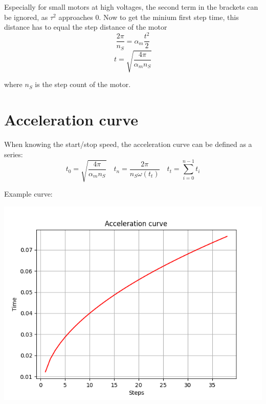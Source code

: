 \documentclass{article}
\begin{document}
    Especially for small motors at high voltages, the second term in the brackets can be ignored, as $\tau^2$ approaches 0. Now to get the minium first step time, this distance has to equal the step distance of the motor
    \[
        \frac{2\pi}{n_S} = \alpha_m \frac{t^2}{2}
    \]
    \begin{equation}
        t = \sqrt{\frac{4\pi}{\alpha_m n_S}}
    \end{equation}

    where $n_S$ is the step count of the motor.

\section{Acceleration curve}

    When knowing the start/stop speed, the acceleration curve can be defined as a series:
    \begin{equation}
        t_0 = \sqrt{\frac{4\pi}{\alpha_m n_S}} \quad
        t_{n} = \frac{2\pi}{n_S\omega(t_t)} \quad t_t = \sum_{i = 0}^{n - 1}{t_i}
    \end{equation}
    
    Example curve:
    \begin{center}
        \includegraphics[scale=0.75]{../test/data/Curve1.png}
    \end{center}
\end{document}
